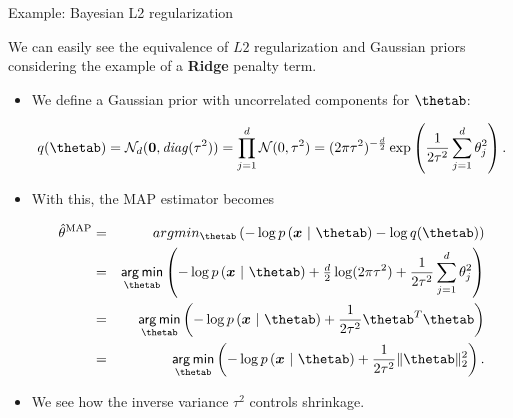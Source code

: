 \begin{vbframe}{Example: Bayesian L2 regularization}

\small We can easily see the equivalence of $L2$ regularization and Gaussian 
priors considering the example of a \textbf{Ridge} penalty term.

\begin{itemize}
  \small
  \item We define a Gaussian prior with uncorrelated components for $\thetab$:
  \begin{footnotesize}
    $$q(\thetab) = \mathcal{N}_d(\bm{0}, \mathit{diag}(\tau^2)) 
    = \prod_{j = 1}^d  \mathcal{N}(0, \tau^2)  
    = (2\pi\tau^2)^{-\frac{d}{2}} \exp \left( \frac{1}{2\tau^2} \sum_{j = 1}^d 
    \theta_j^2 \right).$$
  \end{footnotesize} 
  \item With this, the MAP estimator becomes
  \begin{footnotesize}
  \begin{eqnarray*}
    \thetah^{\text{MAP}} &=& argmin_{\thetab} \left(
    - \log p\left(\xv ~|~ \thetab\right) - \log q(\thetab)
    \right) \\
    &=& \argmin_{\thetab} \left(
    - \log p\left(\xv ~|~ \thetab\right) + \tfrac{d}{2} \log(2\pi \tau^2) +
    \frac{1}{2\tau^2} \sum_{j = 1}^d \theta_j^2
    \right) \\
    &=& \argmin_{\thetab} \left(
    - \log p\left(\xv ~|~ \thetab\right) + \frac{1}{2\tau^2} {\thetab}^T\thetab 
    \right) \\
    &=& \argmin_{\thetab} \left(
    - \log p\left(\xv ~|~ \thetab\right) + \frac{1}{2\tau^2} \| \thetab \|_2^2
    \right).
  \end{eqnarray*}
  \end{footnotesize} 
  \item We see how the inverse variance $\tau^2$ controls shrinkage.
\end{itemize}
  


\end{vbframe}
